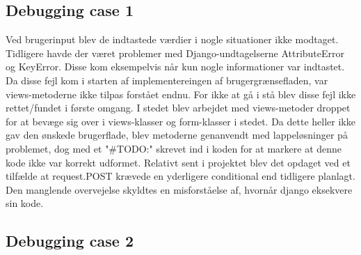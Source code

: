\documentclass[]{article}
\begin{document}
\subsection{Debugging case 1}

Ved brugerinput blev de indtastede værdier i nogle situationer ikke modtaget. Tidligere havde der været problemer med Django-undtagelserne AttributeError og KeyError. Disse kom eksempelvis når kun nogle informationer var indtastet. Da disse fejl kom i starten af implementereingen af brugergrænsefladen, var views-metoderne ikke tilpas forstået endnu. For ikke at gå i stå blev disse fejl ikke rettet/fundet i første omgang. I stedet blev arbejdet med views-metoder droppet for at bevæge sig over i views-klasser og form-klasser i stedet. Da dette heller ikke gav den ønskede brugerflade, blev metoderne genanvendt med lappeløsninger på problemet, dog med et "\#TODO:" skrevet ind i koden for at markere at denne kode ikke var korrekt udformet. Relativt sent i projektet blev det opdaget ved et tilfælde at request.POST krævede en yderligere conditional end tidligere planlagt. Den manglende overvejelse skyldtes en misforståelse af, hvornår django eksekvere sin kode.

\subsection{Debugging case 2}
\end{document}
